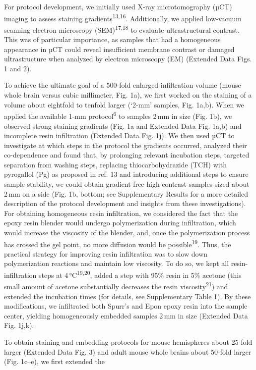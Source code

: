 \documentclass{article}
\begin{document}
For protocol development, we initially used X-ray microtomography (µCT) imaging to assess staining gradients\textsuperscript{13,16}. Additionally, we applied low-vacuum scanning electron microscopy (SEM)\textsuperscript{17,18} to evaluate ultrastructural contrast. This was of particular importance, as samples that had a homogeneous appearance in µCT could reveal insufficient membrane contrast or damaged ultrastructure when analyzed by electron microscopy (EM) (Extended Data Figs. 1 and 2).

To achieve the ultimate goal of a 500-fold enlarged infiltration volume (mouse whole brain versus cubic millimeter, Fig. 1a), we first worked on the staining of a volume about eightfold to tenfold larger (‘2-mm’ samples, Fig. 1a,b). When we applied the available 1-mm protocol\textsuperscript{6} to samples 2\,mm in size (Fig. 1b), we observed strong staining gradients (Fig. 1a and Extended Data Fig. 1a,b) and incomplete resin infiltration (Extended Data Fig. 1j). We then used µCT to investigate at which steps in the protocol the gradients occurred, analyzed their co-dependence and found that, by prolonging relevant incubation steps, targeted separation from washing steps, replacing thiocarbohydrazide (TCH) with pyrogallol (Pg) as proposed in ref. 13 and introducing additional steps to ensure sample stability, we could obtain gradient-free high-contrast samples sized about 2\,mm on a side (Fig. 1b, bottom; see Supplementary Results for a more detailed description of the protocol development and insights from these investigations). For obtaining homogeneous resin infiltration, we considered the fact that the epoxy resin blender would undergo polymerization during infiltration, which would increase the viscosity of the blender, and, once the polymerization process has crossed the gel point, no more diffusion would be possible\textsuperscript{19}. Thus, the practical strategy for improving resin infiltration was to slow down polymerization reactions and maintain low viscosity. To do so, we kept all resin-infiltration steps at 4\,°C\textsuperscript{19,20}, added a step with 95\% resin in 5\% acetone (this small amount of acetone substantially decreases the resin viscosity\textsuperscript{21}) and extended the incubation times (for details, see Supplementary Table 1). By these modifications, we infiltrated both Spurr’s and Epon epoxy resin into the sample center, yielding homogeneously embedded samples 2\,mm in size (Extended Data Fig. 1j,k).

To obtain staining and embedding protocols for mouse hemispheres about 25-fold larger (Extended Data Fig. 3) and adult mouse whole brains about 50-fold larger (Fig. 1c–e), we first extended the
\end{document}
